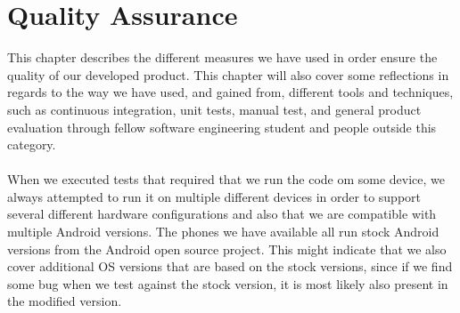 
\chapter{Quality Assurance}
\label{cha:quality_assurance}

This chapter describes the different measures we have used in order ensure the quality of our developed product. This chapter will also cover some reflections in regards to the way we have used, and gained from, different tools and techniques, such as continuous integration, unit tests, manual test, and general product evaluation through fellow software engineering student and  people outside this category. 
\\\\
When we executed tests that required that we run the code om some device, we always attempted to run it on multiple different devices in order to support several different hardware configurations and also that we are compatible with multiple Android versions. The phones we have available all run stock Android versions from the Android open source project. This might indicate that we also cover additional OS versions that are based on the stock versions, since if we find some bug when we test against the stock version, it is most likely also present in the modified version. 














